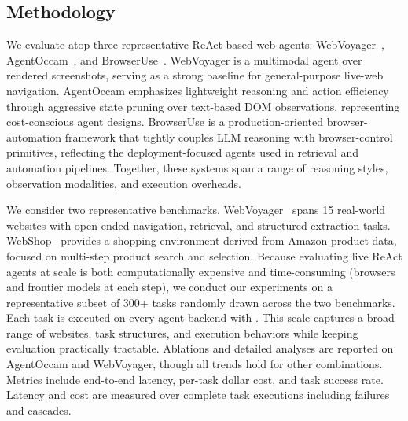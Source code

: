 \subsection{Methodology}
\begin{sloppypar}
We evaluate \sys atop three representative ReAct-based web agents: WebVoyager~\cite{webvoyager}, AgentOccam~\cite{agentoccam}, and BrowserUse~\cite{browseruse}. WebVoyager is a multimodal agent over rendered screenshots, serving as a strong baseline for general-purpose live-web navigation. AgentOccam emphasizes lightweight reasoning and action efficiency through aggressive state pruning over text-based DOM observations, representing cost-conscious agent designs. BrowserUse is a production-oriented browser-automation framework that tightly couples LLM reasoning with browser-control primitives, reflecting the deployment-focused agents used in retrieval and automation pipelines. Together, these systems span a range of reasoning styles, observation modalities, and execution overheads.
\end{sloppypar}

We consider two representative benchmarks. WebVoyager~\cite{webvoyager} spans 15 real-world websites with open-ended navigation, retrieval, and structured extraction tasks. WebShop~\cite{webshop} provides a shopping environment derived from Amazon product data, focused on multi-step product search and selection. Because evaluating live ReAct agents at scale is both computationally expensive and time-consuming (browsers and frontier models at each step), we conduct our experiments on a representative subset of 300+ tasks randomly drawn across the two benchmarks. Each task is executed on every agent backend with \sys. This scale captures a broad range of websites, task structures, and execution behaviors while keeping evaluation practically tractable. Ablations and detailed analyses are reported on AgentOccam and WebVoyager, though all trends hold for other combinations. Metrics include end-to-end latency, per-task dollar cost, and task success rate. Latency and cost are measured over complete task executions including failures and cascades.



